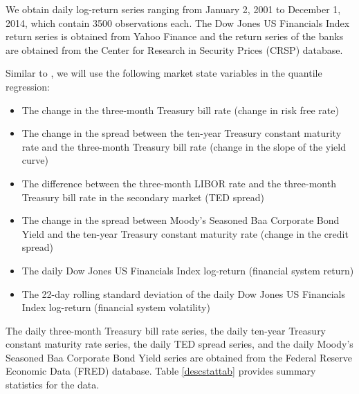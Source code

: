 \documentclass[12pt]{article}
\begin{document}
\noindent We obtain daily log-return series ranging from January 2, 2001 to December 1, 2014, which contain 3500 observations each. The Dow Jones US Financials Index return series is obtained from Yahoo Finance and the return series of the banks are obtained from the Center for Research in Security Prices (CRSP) database.

Similar to \citet{adrian}, we will use the following market state variables in the quantile regression:
\begin{itemize}
  \item The change in the three-month Treasury bill rate (change in risk free rate)
  \item The change in the spread between the ten-year Treasury constant maturity rate and the three-month Treasury bill rate (change in the slope of the yield curve)
  \item The difference between the three-month LIBOR rate and the three-month Treasury bill rate in the secondary market (TED spread)
  \item The change in the spread between Moody's Seasoned Baa Corporate Bond Yield and the ten-year Treasury constant maturity rate (change in the credit spread)
  \item The daily Dow Jones US Financials Index log-return (financial system return)
  \item The 22-day rolling standard deviation of the daily Dow Jones US Financials Index log-return (financial system volatility)
\end{itemize}

\noindent The daily three-month Treasury bill rate series, the daily ten-year Treasury constant maturity rate series, the daily TED spread series, and the daily Moody's Seasoned Baa Corporate Bond Yield series are obtained from the Federal Reserve Economic Data (FRED) database. Table \ref{descstattab} provides summary statistics for the data.
\end{document}
